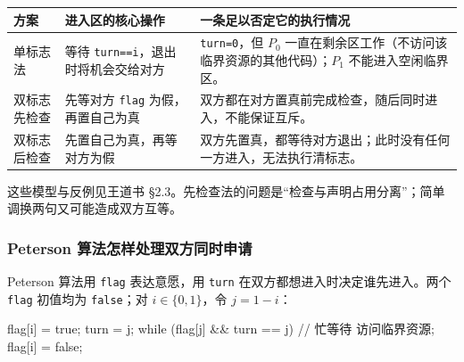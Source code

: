 \begin{wideblock}

\par\medskip\noindent\begin{minipage}{\linewidth}\fontsize{9.3}{12}\selectfont\begin{tabularx}{\linewidth}{@{}YYY@{}}
\toprule\noalign{}
\begin{minipage}[b]{\linewidth}\raggedright
方案
\end{minipage} & \begin{minipage}[b]{\linewidth}\raggedright
进入区的核心操作
\end{minipage} & \begin{minipage}[b]{\linewidth}\raggedright
一条足以否定它的执行情况
\end{minipage} \\
\midrule\noalign{}


单标志法 & 等待 \texttt{turn=\allowbreak{}=\allowbreak{}i}，退出时将机会交给对方 & \texttt{turn=\allowbreak{}0}，但 \(P_0\) 一直在剩余区工作（不访问该临界资源的其他代码）；\(P_1\) 不能进入空闲临界区。 \\
双标志先检查 & 先等对方 \texttt{flag} 为假，再置自己为真 & 双方都在对方置真前完成检查，随后同时进入，不能保证互斥。 \\
双标志后检查 & 先置自己为真，再等对方为假 & 双方先置真，都等待对方退出；此时没有任何一方进入，无法执行清标志。 \\
\bottomrule\end{tabularx}
\end{minipage}\par\medskip

\end{wideblock}

这些模型与反例见王道书 §2.3。先检查法的问题是``检查与声明占用分离''；简单调换两句又可能造成双方互等。

\subsubsection{Peterson 算法怎样处理双方同时申请}\label{OS02-auto-10}

Peterson 算法用 \texttt{flag} 表达意愿，用 \texttt{turn} 在双方都想进入时决定谁先进入。两个 \texttt{flag} 初值均为 \texttt{false}；对 \(i\in\{0,1\}\)，令 \(j=1-i\)：

\par\medskip\noindent\begin{minipage}{\linewidth}
\begin{codeblock}[language={}]
flag[i] = true;
turn = j;
while (flag[j] && turn == j) { }  // 忙等待
访问临界资源;
flag[i] = false;
\end{codeblock}
\end{minipage}\par\medskip

